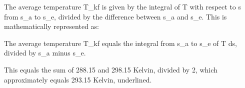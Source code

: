 The average temperature T_kf is given by the integral of T with respect to s from s_a to s_e, divided by the difference between s_a and s_e. This is mathematically represented as:

The average temperature T_kf equals the integral from s_a to s_e of T ds, divided by s_a minus s_e.

This equals the sum of 288.15 and 298.15 Kelvin, divided by 2, which approximately equals 293.15 Kelvin, underlined.